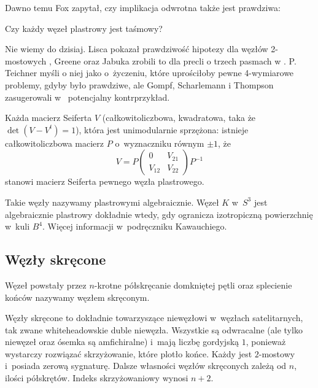 Dawno temu Fox zapytał, czy implikacja odwrotna także jest prawdziwa:

\begin{conjecture}
    Czy każdy węzeł plastrowy jest taśmowy?
\end{conjecture}

Nie wiemy do dzisiaj.
Lisca pokazał prawdziwość hipotezy dla węzłów 2-mostowych \cite{lisca07}, Greene oraz Jabuka zrobili to dla precli o trzech pasmach w \cite{greene11}.
P. Teichner myśli o niej jako o~życzeniu, które uprościłoby pewne 4-wymiarowe problemy, gdyby było prawdziwe, ale Gompf, Scharlemann i Thompson zasugerowali w~\cite{gompf10} potencjalny kontrprzykład.

\begin{proposition}
    Każda macierz Seiferta $V$ (całkowitoliczbowa, kwadratowa, taka że $\det (V - V^t) = 1$), która jest unimodularnie sprzężona: istnieje całkowitoliczbowa macierz $P$ o~wyznaczniku równym $\pm 1$, że
    \begin{equation}
        V = P \begin{pmatrix} 0 & V_{21} \\ V_{12} & V_{22} \end{pmatrix} P^{-1}
    \end{equation}
    stanowi macierz Seiferta pewnego węzła plastrowego.
\end{proposition}

Takie węzły nazywamy plastrowymi algebraicznie.
Węzeł $K$ w~$S^3$ jest algebraicznie plastrowy dokładnie wtedy, gdy ogranicza izotropiczną powierzchnię w~kuli $B^4$.
Więcej informacji w~podręczniku Kawauchiego.


\subsection{Węzły skręcone}
\begin{definition}
    \label{def:twist_knot}
    Węzeł powstały przez $n$-krotne półskręcanie domkniętej pętli oraz splecienie końców nazywamy węzłem skręconym.
\end{definition}

Węzły skręcone to dokładnie towarzyszące niewęzłowi w~węzłach satelitarnych, tak zwane whiteheadowskie duble niewęzła.
Wszystkie są odwracalne (ale tylko niewęzeł oraz ósemka są amfichiralne) i~mają liczbę gordyjską $1$, ponieważ wystarczy rozwiązać skrzyżowanie, które plotło końce.
Każdy jest $2$-mostowy i~posiada zerową sygnaturę.
Dalsze własności węzłów skręconych zależą od $n$, ilości półskrętów.
Indeks skrzyżowaniowy wynosi $n + 2$.

